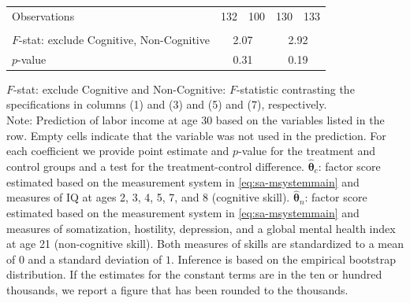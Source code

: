 \documentclass[static]{JJH-Beamer}
\begin{document}
\begin{frame}
\begin{table}[H]
\begin{center}
{\begin{tabular}{lcccccccc}
Observations &        \multicolumn{2}{c}{132} &        \multicolumn{2}{c}{100} &     \multicolumn{2}{c}{130} &         \multicolumn{2}{c}{133}  \\  \\ \midrule
$F$-stat: exclude Cognitive, Non-Cognitive  &             \multicolumn{4}{c}{2.07} &               \multicolumn{4}{c}{2.92}  \\
$p$-value &                \multicolumn{4}{c}{0.31} &               \multicolumn{4}{c}{0.19}   \\
\bottomrule
\end{tabular}
}
\end{center}
\tiny \flushleft
$F$-stat: exclude Cognitive and Non-Cognitive: $F$-statistic contrasting the specifications in columns (1) and (3) and (5) and (7), respectively.\\
Note: Prediction of labor income at age 30 based on the variables listed in the row. Empty cells indicate that the variable was not used in the prediction. For each coefficient we provide point estimate and $p$-value for the treatment and control groups and a test for the treatment-control difference. $\hat{\bm{\theta}}_{c}$: factor score estimated based on the measurement system in \eqref{eq:sa-msystemmain} and measures of IQ at ages 2, 3, 4, 5, 7, and 8 (cognitive skill). $\hat{\bm{\theta}}_{n}$: factor score estimated based on the measurement system in \eqref{eq:sa-msystemmain} and measures of somatization, hostility, depression, and a global mental health index at age 21 (non-cognitive skill). Both measures of skills are standardized to a mean of $0$ and a standard deviation of $1$. Inference is based on the empirical bootstrap distribution. If the estimates for the constant terms are in the ten or hundred thousands, we report a figure that has been rounded to the thousands.\\
\end{table}

\end{frame}
\end{document}

